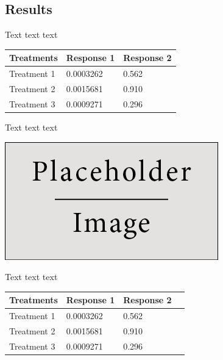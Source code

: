 \documentclass[a0,landscape]{a0poster}
\begin{document}
\begin{multicols}{3}


\section*{Results}

Text text text
%
\begin{table} %
\begin{tabular}{l l l}
\toprule
\textbf{Treatments} & \textbf{Response 1} & \textbf{Response 2}\\
\midrule
Treatment 1 & 0.0003262 & 0.562 \\
Treatment 2 & 0.0015681 & 0.910 \\
Treatment 3 & 0.0009271 & 0.296 \\
\bottomrule
\end{tabular}
\end{table}
%

Text text text
\begin{center}\vspace{1cm}
\includegraphics[width=0.8\linewidth]{placeholder}
\end{center}\vspace{1cm}

Text text text

\begin{center}\vspace{1cm}
\begin{tabular}{l l l l}
\toprule
\textbf{Treatments} & \textbf{Response 1} & \textbf{Response 2} \\
\midrule
Treatment 1 & 0.0003262 & 0.562 \\
Treatment 2 & 0.0015681 & 0.910 \\
Treatment 3 & 0.0009271 & 0.296 \\
\bottomrule
\end{tabular}
\end{center}\vspace{1cm}


\end{multicols}
\end{document}
